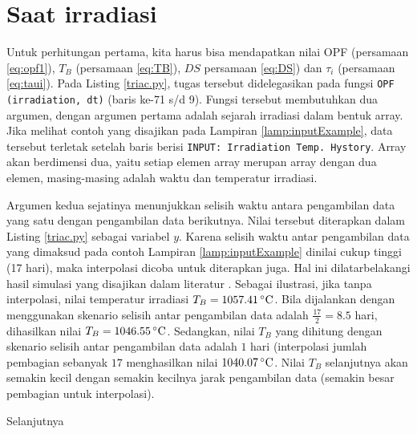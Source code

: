 \documentclass[a4paper,11pt]{report}
\begin{document}
\section{Saat irradiasi}
Untuk perhitungan pertama, kita harus bisa mendapatkan nilai OPF (persamaan \ref{eq:opf1}), $T_B$ (persamaan \ref{eq:TB}), $DS$ persamaan \ref{eq:DS}) dan $\tau_i$ (persamaan \ref{eq:taui}). Pada Listing \ref{triac.py}, tugas tersebut didelegasikan pada fungsi \texttt{OPF (irradiation, dt)} (baris ke-71 s/d 9). Fungsi tersebut membutuhkan dua argumen, dengan argumen pertama adalah sejarah irradiasi dalam bentuk array. Jika melihat contoh yang disajikan pada Lampiran \ref{lamp:inputExample}, data tersebut terletak setelah baris berisi \texttt{INPUT: Irradiation Temp. Hystory}. Array akan berdimensi dua, yaitu setiap elemen array merupan array dengan dua elemen, masing-masing adalah waktu dan temperatur irradiasi.

Argumen kedua sejatinya menunjukkan selisih waktu antara pengambilan data yang satu dengan pengambilan data berikutnya. Nilai tersebut diterapkan dalam Listing \ref{triac.py} sebagai variabel $y$. Karena selisih waktu antar pengambilan data yang dimaksud pada contoh Lampiran \ref{lamp:inputExample} dinilai cukup tinggi (17 hari), maka interpolasi dicoba untuk diterapkan juga. Hal ini dilatarbelakangi hasil simulasi yang disajikan dalam literatur \cite{report1}. Sebagai ilustrasi, jika tanpa interpolasi, nilai temperatur irradiasi $T_B=1057.41\,^{\circ}{\rm C}$. Bila dijalankan dengan menggunakan skenario selisih antar pengambilan data adalah $\frac{17}{2}=8.5$ hari, dihasilkan nilai $T_B=1046.55\,^{\circ}{\rm C}$. Sedangkan, nilai $T_B$ yang dihitung dengan skenario selisih antar pengambilan data adalah $1$ hari (interpolasi jumlah pembagian sebanyak $17$ menghasilkan nilai $1040.07\,^{\circ}{\rm C}$. Nilai $T_B$ selanjutnya akan semakin kecil dengan semakin kecilnya jarak pengambilan data (semakin besar pembagian untuk interpolasi).

Selanjutnya






\begin{appendix}
	
	\setcounter{page}{2}
	
\end{appendix}
\end{document}
